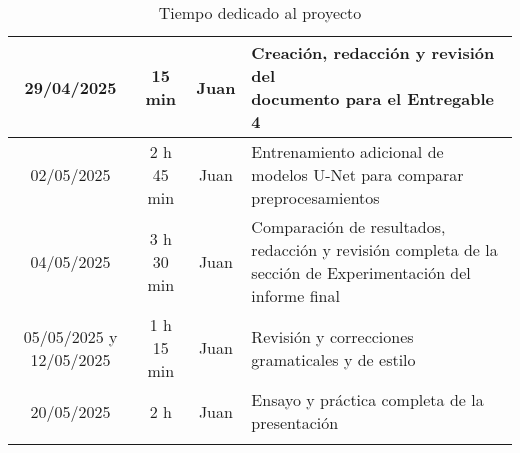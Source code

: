 \documentclass[12pt]{article}
\begin{document}
\begin{longtable}{|c|c|c|p{7.5cm}|}
\hline
29/04/2025 & 15 min & Juan & \makecell{Creación, redacción y revisión del \\ documento para el Entregable 4} \\
\hline
02/05/2025 & 2 h 45 min & Juan & Entrenamiento adicional de modelos U-Net para comparar preprocesamientos \\
\hline
04/05/2025 & 3 h 30 min & Juan & Comparación de resultados, redacción y revisión completa de la sección de Experimentación del informe final \\
\hline
05/05/2025 y 12/05/2025 & 1 h 15 min & Juan & Revisión y correcciones gramaticales y de estilo \\
\hline
20/05/2025 & 2 h & Juan & Ensayo y práctica completa de la presentación \\
\hline
\caption{Tiempo dedicado al proyecto}
\end{longtable}
\end{document}
